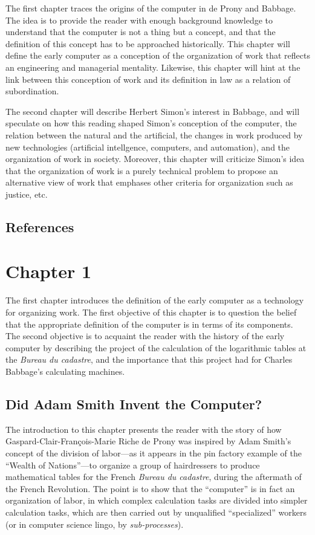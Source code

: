 \documentclass[version=last,draft=false,paper=A4,portrait,twoside=true,twocolumn=true,headinclude=false,footinclude=false,fontsize=12,BCOR=20mm,DIV=13,pagesize=auto,titlepage=false,mpinclude=false,open=right,chapterprefix=true,numbers=autoendperiod,headsepline=false,parskip=false]{scrbook}
\begin{document}
The first chapter traces the origins of the computer in de Prony and
Babbage. The idea is to provide the reader with enough background knowledge
to understand that the computer is not a thing but a concept, and that the
definition of this concept has to be approached historically. This chapter
will define the early computer as a conception of the organization of work
that reflects an engineering and managerial mentality. Likewise, this
chapter will hint at the link between this conception of work and its
definition in law as a relation of subordination.

The second chapter will describe Herbert Simon's interest in Babbage, and
will speculate on how this reading shaped Simon's conception of the
computer, the relation between the natural and the artificial, the changes
in work produced by new technologies (artificial intellgence, computers,
and automation), and the organization of work in society. Moreover, this
chapter will criticize Simon's idea that the organization of work is a
purely technical problem to propose an alternative view of work that
emphases other criteria for organization such as justice, etc.

\section*{References}
\printbibliography[heading=none,keyword=introduction]
\chapter{Chapter 1}
\label{sec:org75e08b6}
The first chapter introduces the definition of the early computer as a
technology for organizing work. The first objective of this chapter is to
question the belief that the appropriate definition of the computer is in
terms of its components. The second objective is to acquaint the reader
with the history of the early computer by describing the project of the
calculation of the logarithmic tables at the \emph{Bureau du cadastre}, and the
importance that this project had for Charles Babbage's calculating
machines.
\section{Did Adam Smith Invent the Computer?}
\label{sec:org161fe11}
The introduction to this chapter presents the reader with the story of how
Gaspard-Clair-François-Marie Riche de Prony was inspired by Adam Smith's
concept of the division of labor---as it appears in the pin factory example
of the ``Wealth of Nations''---to organize a group of hairdressers to
produce mathematical tables for the French \emph{Bureau du cadastre}, during the
aftermath of the French Revolution. The point is to show that the
``computer'' is in fact an organization of labor, in which complex
calculation tasks are divided into simpler calculation tasks, which are
then carried out by unqualified ``specialized'' workers (or in computer
science lingo, by \emph{sub-processes}).
\end{document}
